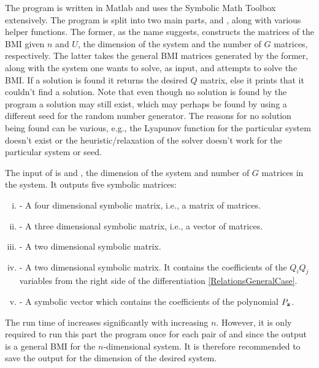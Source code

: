 \documentclass[a4paper,12pt,twoside,BCOR=10mm]{scrbook}
\begin{document}
The program is written in Matlab and uses the Symbolic Math Toolbox extensively. The program is split into two main parts,  and , along with various helper functions. The former, as the name suggests, constructs the matrices of the BMI given $n$ and $U$, the dimension of the system and the number of $G$ matrices, respectively. The latter takes the general BMI matrices generated by the former, along with the system one wants to solve, as input, and attempts to solve the BMI. If a solution is found it returns the desired $Q$ matrix, else it prints that it couldn't find a solution. Note that even though no solution is found by the program a solution may still exist, which may perhaps be found by using a different seed for the random number generator. The reasons for no solution being found can be various, e.g., the Lyapunov function for the particular system doesn't exist or the heuristic/relaxation of the solver doesn't work for the particular system or seed.

The input of  is  and , the dimension of the system and number of $G$ matrices in the system. It outputs five symbolic matrices:
\begin{enumerate}[i)]
    \item {} - A four dimensional symbolic matrix, i.e., a matrix of matrices.
    \item {} - A three dimensional symbolic matrix, i.e., a vector of matrices.
    \item {} - A two dimensional symbolic matrix.
    \item {} - A two dimensional symbolic matrix. It contains the coefficients of the $Q_iQ_j$ variables from the right side of the differentiation \eqref{RelationsGeneralCase}.
    \item {} - A symbolic vector which contains the coefficients of the polynomial $P_{\mathbf{z}}$.
\end{enumerate}
The run time of  increases significantly with increasing $n$. However, it is only required to run this part the program once for each pair of  and  since the output is a general BMI for the $n$-dimensional system. It is therefore recommended to save the output for the dimension of the desired system.
\end{document}
